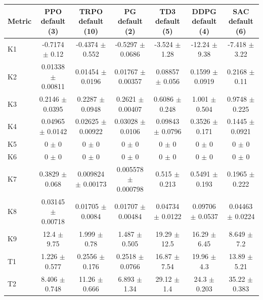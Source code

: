 \begin{tabular}{lcccccc}
\toprule
Metric & PPO default (3) & TRPO default (10) & PG default (2) & TD3 default (5) & DDPG default (4) & SAC default (6) \\
\midrule
K1 & -0.7174 $\pm$ 0.12 & -0.4374 $\pm$ 0.552 & -0.5297 $\pm$ 0.0686 & -3.524 $\pm$ 1.28 & -12.24 $\pm$ 9.38 & -7.418 $\pm$ 3.22 \\
K2 & 0.01338 $\pm$ 0.00811 & 0.01454 $\pm$ 0.0196 & 0.01767 $\pm$ 0.00357 & 0.08857 $\pm$ 0.056 & 0.1599 $\pm$ 0.0919 & 0.2168 $\pm$ 0.11 \\
K3 & 0.2146 $\pm$ 0.0395 & 0.2287 $\pm$ 0.0948 & 0.2621 $\pm$ 0.00407 & 0.6086 $\pm$ 0.248 & 1.001 $\pm$ 0.504 & 0.9748 $\pm$ 0.225 \\
K4 & 0.04965 $\pm$ 0.0142 & 0.02625 $\pm$ 0.00922 & 0.03028 $\pm$ 0.0106 & 0.09843 $\pm$ 0.0796 & 0.3526 $\pm$ 0.171 & 0.1445 $\pm$ 0.0921 \\
K5 & 0 $\pm$ 0 & 0 $\pm$ 0 & 0 $\pm$ 0 & 0 $\pm$ 0 & 0 $\pm$ 0 & 0 $\pm$ 0 \\
K6 & 0 $\pm$ 0 & 0 $\pm$ 0 & 0 $\pm$ 0 & 0 $\pm$ 0 & 0 $\pm$ 0 & 0 $\pm$ 0 \\
K7 & 0.3829 $\pm$ 0.068 & 0.009824 $\pm$ 0.00173 & 0.005578 $\pm$ 0.000798 & 0.515 $\pm$ 0.213 & 0.5491 $\pm$ 0.193 & 0.1965 $\pm$ 0.222 \\
K8 & 0.03145 $\pm$ 0.00718 & 0.01705 $\pm$ 0.0084 & 0.01707 $\pm$ 0.00484 & 0.04734 $\pm$ 0.0122 & 0.09706 $\pm$ 0.0537 & 0.04463 $\pm$ 0.0224 \\
K9 & 12.4 $\pm$ 9.75 & 1.999 $\pm$ 0.78 & 1.487 $\pm$ 0.505 & 19.29 $\pm$ 12.5 & 16.29 $\pm$ 6.45 & 8.649 $\pm$ 7.2 \\
T1 & 1.226 $\pm$ 0.577 & 0.2556 $\pm$ 0.176 & 0.2518 $\pm$ 0.0766 & 16.87 $\pm$ 7.54 & 19.96 $\pm$ 4.3 & 13.89 $\pm$ 5.21 \\
T2 & 8.406 $\pm$ 0.748 & 11.26 $\pm$ 0.666 & 6.893 $\pm$ 1.34 & 29.12 $\pm$ 1.4 & 24.3 $\pm$ 0.203 & 35.22 $\pm$ 0.383 \\
\bottomrule
\end{tabular}

